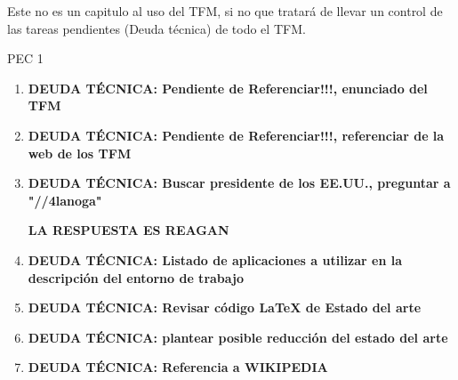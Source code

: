 
Este no es un capitulo al uso del TFM, si no que tratará de llevar un control de las tareas pendientes (Deuda técnica) de todo el TFM.

PEC 1

\begin{enumerate}
    \item {\color{red}\textbf{DEUDA TÉCNICA: Pendiente de Referenciar!!!, enunciado del TFM}}
    \item {\color{red}\textbf{DEUDA TÉCNICA: Pendiente de Referenciar!!!, referenciar de la web de los TFM}}
    \item {\color{red}\textbf{DEUDA TÉCNICA: Buscar presidente de los EE.UU., preguntar a "//4lanoga"}}
    
    {\color{red}\textbf{LA RESPUESTA ES REAGAN}}
    
    \item {\color{red}\textbf{DEUDA TÉCNICA: Listado de aplicaciones a utilizar en la descripción del entorno de trabajo}}
    \item {\color{red}\textbf{DEUDA TÉCNICA: Revisar código LaTeX de Estado del arte}}
    \item {\color{red}\textbf{DEUDA TÉCNICA: plantear posible reducción del estado del arte}}
    \item {\color{red}\textbf{DEUDA TÉCNICA: Referencia a WIKIPEDIA}}
    
\end{enumerate}